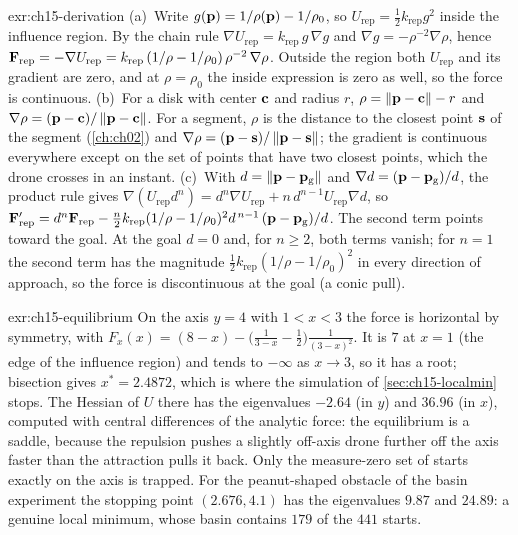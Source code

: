 
\begin{solution}{exr:ch15-derivation}
(a)~Write $g(\mathbf{p})=1/\rho(\mathbf{p})-1/\rho_0$, so $U_{\mathrm{rep}}=\tfrac12 k_{\mathrm{rep}}g^2$
inside the influence region. By the chain rule
$\nabla U_{\mathrm{rep}}=k_{\mathrm{rep}}\,g\,\nabla g$ and
$\nabla g=-\rho^{-2}\nabla\rho$, hence
$\mathbf{F}_{\mathrm{rep}}=-\nabla U_{\mathrm{rep}}=k_{\mathrm{rep}}\,(1/\rho-1/\rho_0)\,\rho^{-2}\,\nabla\rho$.
Outside the region both $U_{\mathrm{rep}}$ and its gradient are zero, and at
$\rho=\rho_0$ the inside expression is zero as well, so the force is continuous.
(b)~For a disk with center $\mathbf{c}$ and radius $r$, $\rho=\left\lVert \mathbf{p}-\mathbf{c} \right\rVert-r$
and $\nabla\rho=(\mathbf{p}-\mathbf{c})/\left\lVert \mathbf{p}-\mathbf{c} \right\rVert$. For a segment, $\rho$ is
the distance to the closest point $\mathbf{s}$ of the segment (\cref{ch:ch02}) and
$\nabla\rho=(\mathbf{p}-\mathbf{s})/\left\lVert \mathbf{p}-\mathbf{s} \right\rVert$; the gradient is continuous
everywhere except on the set of points that have two closest points, which the
drone crosses in an instant.
(c)~With $d=\left\lVert \mathbf{p}-\mathbf{p}_{\mathrm{g}} \right\rVert$ and $\nabla d=(\mathbf{p}-\mathbf{p}_{\mathrm{g}})/d$,
the product rule gives
$\nabla(U_{\mathrm{rep}}d^n)=d^n\nabla U_{\mathrm{rep}}+n\,d^{n-1}U_{\mathrm{rep}}\nabla d$,
so
$\mathbf{F}'_{\mathrm{rep}}=d^n\mathbf{F}_{\mathrm{rep}}-\tfrac{n}{2}k_{\mathrm{rep}}(1/\rho-1/\rho_0)^2d^{\,n-1}\,(\mathbf{p}-\mathbf{p}_{\mathrm{g}})/d$.
The second term points toward the goal. At the goal $d=0$ and, for $n\ge2$,
both terms vanish; for $n=1$ the second term has the magnitude
$\tfrac12 k_{\mathrm{rep}}(1/\rho-1/\rho_0)^2$ in every direction of approach, so
the force is discontinuous at the goal (a conic pull).
\end{solution}

\begin{solution}{exr:ch15-equilibrium}
On the axis $y=4$ with $1<x<3$ the force is horizontal by symmetry, with
$F_x(x)=(8-x)-\bigl(\tfrac{1}{3-x}-\tfrac12\bigr)\tfrac{1}{(3-x)^2}$. It is
$7$ at $x=1$ (the edge of the influence region) and tends to $-\infty$ as
$x\to3$, so it has a root; bisection gives $x^*=2.4872$, which is where the
simulation of \cref{sec:ch15-localmin} stops. The Hessian of $U$ there has the
eigenvalues $-2.64$ (in $y$) and $36.96$ (in $x$), computed with central
differences of the analytic force: the equilibrium is a saddle, because the
repulsion pushes a slightly off-axis drone further off the axis faster than the
attraction pulls it back. Only the measure-zero set of starts exactly on the axis
is trapped. For the peanut-shaped obstacle of the basin experiment the stopping
point $(2.676,4.1)$ has the eigenvalues $9.87$ and $24.89$: a genuine local
minimum, whose basin contains $179$ of the $441$ starts.
\end{solution}

